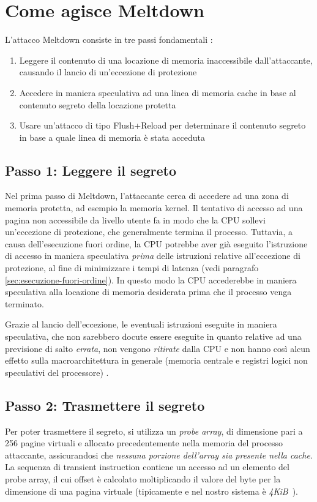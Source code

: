 \section{Come agisce Meltdown}
L'attacco Meltdown consiste in tre passi fondamentali \cite{lipp:meltdown}:
\begin{enumerate}
	\item Leggere il contenuto di una locazione di memoria inaccessibile dall'attaccante, causando il lancio di un'eccezione di protezione
	\item Accedere in maniera speculativa ad una linea di memoria cache in base al contenuto segreto della locazione protetta
	\item Usare un'attacco di tipo Flush+Reload per determinare il contenuto segreto in base a quale linea di memoria è stata acceduta
\end{enumerate}

\subsection{Passo 1: Leggere il segreto}
Nel prima passo di Meltdown, l'attaccante cerca di accedere ad una zona di memoria protetta, ad esempio la memoria kernel.
Il tentativo di accesso ad una pagina non accessibile da livello utente fa in modo che la CPU sollevi un'eccezione di protezione, che generalmente termina il processo. 
Tuttavia, a causa dell'esecuzione fuori ordine, la CPU potrebbe aver già eseguito l'istruzione di accesso in maniera speculativa \emph{prima} delle istruzioni relative all'eccezione di protezione, al fine di minimizzare i tempi di latenza (vedi paragrafo \ref{sec:esecuzione-fuori-ordine}).
In questo modo la CPU accederebbe in maniera speculativa alla locazione di memoria desiderata prima che il processo venga terminato.

Grazie al lancio dell'eccezione, le eventuali istruzioni eseguite in maniera speculativa, che non sarebbero docute essere eseguite in quanto relative ad una previsione di salto \emph{errata}, non vengono \emph{ritirate} dalla CPU e non hanno così alcun effetto sulla macroarchitettura in generale (memoria centrale e registri logici non speculativi del processore) \cite{frosini:calcolatori2}.

\subsection{Passo 2: Trasmettere il segreto}
\label{sec:meltdown-passo-2}
Per poter trasmettere il segreto, si utilizza un \emph{probe array}, di dimensione pari a 256 pagine virtuali e allocato precedentemente nella memoria del processo attaccante, assicurandosi che \emph{nessuna porzione dell'array sia presente nella cache}. 
La sequenza di transient instruction contiene un accesso ad un elemento del probe array, il cui offset è calcolato moltiplicando il valore del byte per la dimensione di una pagina virtuale (tipicamente e nel nostro sistema  è \emph{4KiB}~\cite{lettieri:paginazione}).

